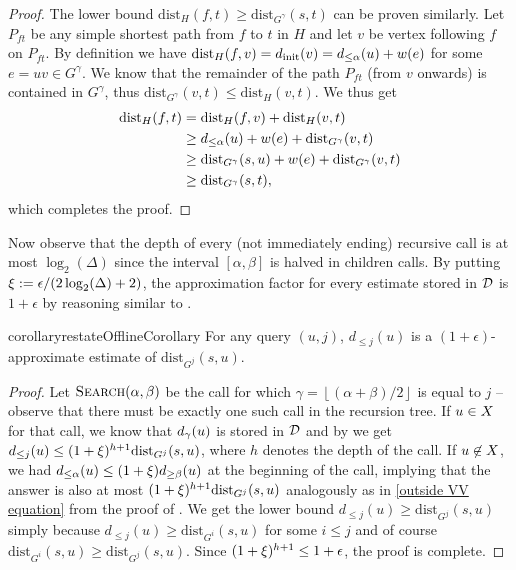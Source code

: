 \documentclass[11pt,letterpaper]{article}
\theoremstyle{plain}
\newcommand{\eps}{\ensuremath{\epsilon}}
\newcommand{\dist}{\mathrm{dist}}
\newcommand{\eq}[1]{\begin{align*} #1 \end{align*}}
\begin{document}
\begin{proof}
The lower bound $\dist_H(f, t) \ge \dist_{G^\gamma}(s, t)$ can be proven similarly.
Let $P_{ft}$ be any simple shortest path from $f$ to $t$ in $H$ and let $v$ be vertex following $f$ on $P_{ft}$.
By definition we have $\dist_H(f, v) = \dinit(v) = \dla(u) + w(e)$ for some $e = uv \in G^\gamma$.
We know that the remainder of the path $P_{ft}$ (from $v$ onwards) is contained in $G^\gamma$, thus $\dist_{G^\gamma}(v, t) \le \dist_H(v, t)$.
We thus get
\eq{
  \dist_H(f, t) &= \dist_H(f, v) + \dist_H(v, t) \\
  &\ge \dla(u) + w(e) + \dist_{G^\gamma}(v, t) \\
  &\ge \dist_{G^\gamma}(s, u) + w(e) + \dist_{G^\gamma}(v, t) \\
  &\ge \dist_{G^\gamma}(s, t),
}
which completes the proof.
\end{proof}



Now observe that the depth of every (not immediately ending) recursive call is at most $\log_2(\Delta)$ since the interval $[\alpha,\beta]$ is halved in children calls.
By putting $\epsp:=\eps/(2\log_2(\Delta)+2)$, the approximation factor for every estimate stored in $\mathcal{D}$ is $1 + \eps$ by reasoning similar to .

\begin{restatable}[]{corollary}{restateOfflineCorollary}
For any query $(u, j)$, $d_{\le j}(u)$ is a $(1 + \eps)$-approximate estimate of $\dist_{G^j}(s,u)$.
\end{restatable}
\begin{proof}
Let $\textproc{Search}(\alpha, \beta)$ be the call for which $\gamma = \left\lfloor\left(\alpha + \beta\right) / 2\right\rfloor$ is equal to $j$ -- observe that there must be exactly one such call in the recursion tree.
If $u \in X$ for that call, we know that $d_{\gamma}(u)$ is stored in $\mathcal{D}$ and by  we get
$d_{\le j}(u) \le (1 + \epsp)^{h + 1}\dist_{G^j}(s,u)$, where $h$ denotes the depth of the call.
If $u \not \in X$, we had $d_{\le\alpha}(u) \le (1 + \xi)d_{\ge\beta}(u)$ at the beginning of the call, implying that the answer is also at most
$(1 + \epsp)^{h + 1}\dist_{G^j}(s,u)$ analogously as in \eqref{outside VV equation} from the proof of .
We get the lower bound $d_{\le j}(u) \ge \dist_{G^j}(s,u)$ simply because $d_{\le j}(u) \ge \dist_{G^i}(s,u)$ for some $i \le j$ and of course $\dist_{G^i}(s,u) \ge \dist_{G^j}(s,u)$.
Since $(1 + \epsp)^{h + 1} \le 1 + \eps$, the proof is complete.
\end{proof}
\end{document}
